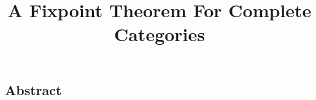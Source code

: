\documentclass[12pt]{article}
\title{A Fixpoint Theorem For Complete Categories}
\begin{document}
\maketitle
\begin{center}
    \section*{Abstract}
\end{center}
\end{document}
